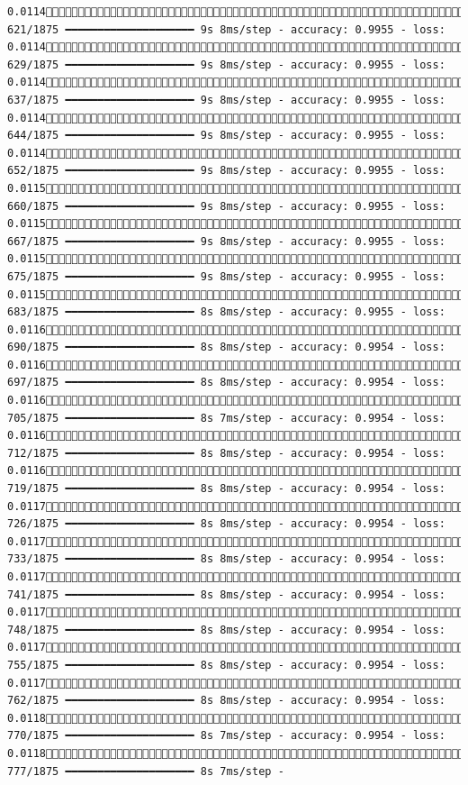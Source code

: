 \documentclass[
  letterpaper,
  DIV=11,
  numbers=noendperiod]{scrreprt}
\begin{document}
\begin{verbatim}
0.0114 621/1875 ━━━━━━━━━━━━━━━━━━━━ 9s 8ms/step - accuracy: 0.9955 - loss: 0.0114 629/1875 ━━━━━━━━━━━━━━━━━━━━ 9s 8ms/step - accuracy: 0.9955 - loss: 0.0114 637/1875 ━━━━━━━━━━━━━━━━━━━━ 9s 8ms/step - accuracy: 0.9955 - loss: 0.0114 644/1875 ━━━━━━━━━━━━━━━━━━━━ 9s 8ms/step - accuracy: 0.9955 - loss: 0.0114 652/1875 ━━━━━━━━━━━━━━━━━━━━ 9s 8ms/step - accuracy: 0.9955 - loss: 0.0115 660/1875 ━━━━━━━━━━━━━━━━━━━━ 9s 8ms/step - accuracy: 0.9955 - loss: 0.0115 667/1875 ━━━━━━━━━━━━━━━━━━━━ 9s 8ms/step - accuracy: 0.9955 - loss: 0.0115 675/1875 ━━━━━━━━━━━━━━━━━━━━ 9s 8ms/step - accuracy: 0.9955 - loss: 0.0115 683/1875 ━━━━━━━━━━━━━━━━━━━━ 8s 8ms/step - accuracy: 0.9955 - loss: 0.0116 690/1875 ━━━━━━━━━━━━━━━━━━━━ 8s 8ms/step - accuracy: 0.9954 - loss: 0.0116 697/1875 ━━━━━━━━━━━━━━━━━━━━ 8s 8ms/step - accuracy: 0.9954 - loss: 0.0116 705/1875 ━━━━━━━━━━━━━━━━━━━━ 8s 7ms/step - accuracy: 0.9954 - loss: 0.0116 712/1875 ━━━━━━━━━━━━━━━━━━━━ 8s 8ms/step - accuracy: 0.9954 - loss: 0.0116 719/1875 ━━━━━━━━━━━━━━━━━━━━ 8s 8ms/step - accuracy: 0.9954 - loss: 0.0117 726/1875 ━━━━━━━━━━━━━━━━━━━━ 8s 8ms/step - accuracy: 0.9954 - loss: 0.0117 733/1875 ━━━━━━━━━━━━━━━━━━━━ 8s 8ms/step - accuracy: 0.9954 - loss: 0.0117 741/1875 ━━━━━━━━━━━━━━━━━━━━ 8s 8ms/step - accuracy: 0.9954 - loss: 0.0117 748/1875 ━━━━━━━━━━━━━━━━━━━━ 8s 8ms/step - accuracy: 0.9954 - loss: 0.0117 755/1875 ━━━━━━━━━━━━━━━━━━━━ 8s 8ms/step - accuracy: 0.9954 - loss: 0.0117 762/1875 ━━━━━━━━━━━━━━━━━━━━ 8s 8ms/step - accuracy: 0.9954 - loss: 0.0118 770/1875 ━━━━━━━━━━━━━━━━━━━━ 8s 7ms/step - accuracy: 0.9954 - loss: 0.0118 777/1875 ━━━━━━━━━━━━━━━━━━━━ 8s 7ms/step - 
\end{verbatim}
\end{document}
